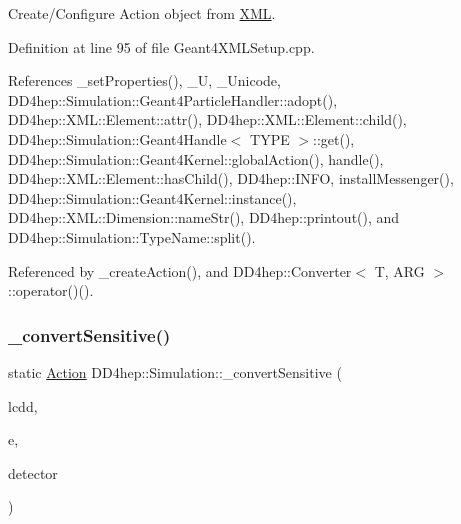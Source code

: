 Create/\+Configure Action object from \hyperlink{namespace_d_d4hep_1_1_x_m_l}{X\+ML}. 



Definition at line 95 of file Geant4\+X\+M\+L\+Setup.\+cpp.



References \+\_\+set\+Properties(), \+\_\+U, \+\_\+\+Unicode, D\+D4hep\+::\+Simulation\+::\+Geant4\+Particle\+Handler\+::adopt(), D\+D4hep\+::\+X\+M\+L\+::\+Element\+::attr(), D\+D4hep\+::\+X\+M\+L\+::\+Element\+::child(), D\+D4hep\+::\+Simulation\+::\+Geant4\+Handle$<$ T\+Y\+P\+E $>$\+::get(), D\+D4hep\+::\+Simulation\+::\+Geant4\+Kernel\+::global\+Action(), handle(), D\+D4hep\+::\+X\+M\+L\+::\+Element\+::has\+Child(), D\+D4hep\+::\+I\+N\+FO, install\+Messenger(), D\+D4hep\+::\+Simulation\+::\+Geant4\+Kernel\+::instance(), D\+D4hep\+::\+X\+M\+L\+::\+Dimension\+::name\+Str(), D\+D4hep\+::printout(), and D\+D4hep\+::\+Simulation\+::\+Type\+Name\+::split().



Referenced by \+\_\+create\+Action(), and D\+D4hep\+::\+Converter$<$ T, A\+R\+G $>$\+::operator()().

\hypertarget{namespace_d_d4hep_1_1_simulation_ad1e0a4ddeeaccc10df73eaae26c7706b}{}\label{namespace_d_d4hep_1_1_simulation_ad1e0a4ddeeaccc10df73eaae26c7706b} 
\subsubsection{\texorpdfstring{\+\_\+convert\+Sensitive()}{\_convertSensitive()}}
{\footnotesize\ttfamily static \hyperlink{namespace_d_d4hep_1_1_simulation_1_1_setup_aa958972310161bf099d9d22e59d257ab}{Action} D\+D4hep\+::\+Simulation\+::\+\_\+convert\+Sensitive (\begin{DoxyParamCaption}\item[{\hyperlink{namespace_d_d4hep_a9d7154801ec259f2a1d2fe015d140518}{lcdd\+\_\+t} \&}]{lcdd,  }\item[{\hyperlink{_det_factory_helper_8h_ac13b3c79d2bc9214ff0cf5b8dc43dda6}{xml\+\_\+h}}]{e,  }\item[{const string \&}]{detector }\end{DoxyParamCaption})\hspace{0.3cm}{\ttfamily [static]}}



